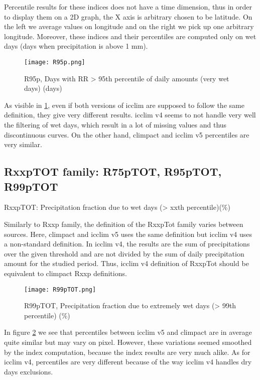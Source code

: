 \documentclass[a4paper,11pt]{article}
\begin{document}
            Percentile results for these indices does not have a time dimension, thus in order to display them on a 2D graph, the X axis is arbitrary chosen to be latitude.
            On the left we average values on longitude and on the right we pick up one arbitrary longitude.
            Moreover, these indices and their percentiles are computed only on wet days (days when precipitation is above 1 mm).

            \begin{figure}
                \centering
                \texttt{[image: R95p.png]}
                \caption{R95p, Days with RR > 95th percentile of daily amounts (very wet days) (days)}
                \label{figure/r95p}
            \end{figure}

            As visible in \ref{figure/r95p}, even if both versions of icclim are supposed to follow the same definition, they give very different results.
            icclim v4 seems to not handle very well the filtering of wet days, which result in a lot of missing values and thus discontinuous curves.
            On the other hand, climpact and icclim v5 percentiles are very similar.

        \subsection{RxxpTOT family: R75pTOT, R95pTOT, R99pTOT}
        RxxpTOT: Precipitation fraction due to wet days (> xxth percentile)(\%)

        Similarly to Rxxp family, the definition of the RxxpTot family varies between sources. 
        Here, climpact and icclim v5 uses the same definition but icclim v4 uses a non-standard definition. 
        In icclim v4, the results are the sum of precipitations over the given threshold and are not divided by the sum of daily precipitation amount for the studied period. 
        Thus, icclim v4 definition of RxxpTot should be equivalent to climpact Rxxp definitions.

        \begin{figure}
            \centering
            \texttt{[image: R99pTOT.png]}
            \caption{R99pTOT, Precipitation fraction due to extremely wet days (> 99th percentile) (\%)}
            \label{figure/r99ptot}
        \end{figure}

        In figure \ref{figure/r99ptot} we see that percentiles between icclim v5 and climpact are in average quite similar but may vary on pixel.
        However, these variations seemed smoothed by the index computation, because the index results are very much alike.
        As for icclim v4, percentiles are very different because of the way icclim v4 handles dry days exclusions. 
\end{document}
